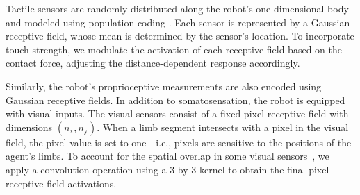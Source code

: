 %


Tactile sensors are randomly distributed along the robot's one-dimensional body and modeled using population coding \cite{Panzeri2010PopulationCoding}. Each sensor is represented by a Gaussian receptive field, whose mean is determined by the sensor's location. %
To incorporate touch strength, we modulate the activation of each receptive field based on the contact force, adjusting the distance-dependent response accordingly.  

Similarly, the robot's proprioceptive measurements are also encoded using Gaussian receptive fields. In addition to somatosensation, the robot is equipped with visual inputs. The visual sensors consist of a fixed pixel receptive field with dimensions $(n_\text{x}, n_\text{y})$. When a limb segment intersects with a pixel in the visual field, the pixel value is set to one---i.e., pixels are sensitive to the positions of the agent's limbs. To account for the spatial overlap in some visual sensors~\cite{Marshall2015}, we apply a convolution operation using a 3-by-3 kernel to obtain the final pixel receptive field activations.  

